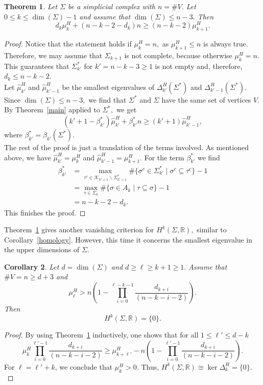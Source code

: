 \documentclass[10pt]{amsart}
\newtheorem{theorem}{Theorem}[section]
\newtheorem{corollary}[theorem]{Corollary}
\theoremstyle{definition}
\newcommand{\K}{\mathcal{K}}
\begin{document}
\begin{theorem}\label{alexestimate}
    Let $\Sigma$ be a simplicial complex with $n = \#V.$ Let $0\leq k\leq\dim(\Sigma)-1$ and assume that $\dim(\Sigma)\leq n-3.$ Then
    \[d_k\mu^H_k+(n-k-2-d_k)n\geq(n-k-2)\mu^H_{k+1}.\]
\end{theorem}
\begin{proof}
    Notice that the statement holds if $\mu_k^H = n,$ as $\mu^H_{k+1}\leq n$ is always true. Therefore, we may assume that $\Sigma_{k+1}$ is not complete, because otherwise $\mu^H_k = n.$ This guarantees that $\Sigma^*_{k'}$ for  $k' = n-k-3\geq 1$ is not empty and, therefore, $d_k\leq n-k-2$.\\
    Let   $\widehat\mu^H_{k'}$ and $\widehat\mu^H_{k'-1}$ be the smallest eigenvalues of $\Delta^H_{k'}(\Sigma^*)$ and $\Delta^H_{k'-1}(\Sigma^*).$
    Since $\dim(\Sigma)\leq n-3,$ we find that $\Sigma^*$ and $\Sigma$ have the same set of vertices $V.$
    By Theorem~\ref{main} applied to $\Sigma^*,$ we get     \[(k'+1-\beta^*_{k'})\widehat\mu^H_{k'}+\beta^*_{k'}n\geq(k'+1)\widehat\mu^H_{k'-1},\]
    where $\beta^*_{k'} = \beta_{k'}(\Sigma^*).$ \\
 The rest of the proof is just a translation of the terms involved. As mentioned above, we have $\widehat\mu^H_{k'} = \mu^H_k$ and  $\widehat\mu^H_{k'-1} = \mu^H_{k+1}.$ For the term $\beta^*_{k'}$ we find
 \begin{align*}
     \beta^*_{k'} &= \max_{\tau^c\in \K_{k'+1}\backslash\Sigma^*_{k'+1}}\#\lbrace\sigma^c\in\Sigma^*_{k'}\mid\sigma^c\subseteq\tau^c\rbrace-1\\
     & = \max_{\tau\in\Sigma_k}\#\lbrace \sigma\in A_k\mid\tau\subseteq\sigma\rbrace-1\\
     & = n-k-2-d_k. \end{align*}
      This finishes the proof. \end{proof}
Theorem~\ref{alexestimate} gives another vanishing criterion for $H^k(\Sigma,\mathbb{R}),$ similar to Corollary~\ref{homology}. However, this time it concerns the smallest eigenvalue in the upper dimensions of $\Sigma.$
\begin{corollary}
    Let $d = \dim(\Sigma)$ and $d\geq\ell\geq k+1\geq 1.$ Assume that $\#V = n\geq d+3$ and 
    \[\mu^H_\ell> n\left(1-\prod_{i= 0}^{\ell-k-1}\frac{d_{k+i}}{(n-k-i-2)}\right).\]
    Then \[H^k(\Sigma,\mathbb{R}) = \lbrace 0\rbrace.\]
\end{corollary}
\begin{proof}
    By using Theorem~\ref{alexestimate} inductively, one shows that for all $1\leq \ell'\leq d-k$
    \[\mu^H_k\prod_{i = 0}^{\ell'-1}\frac{d_{k+i}}{(n-k-i-2)}\geq \mu^H_{k+\ell'}-n\left(1-\prod_{i = 0}^{\ell'-1}\frac{d_{k+i}}{(n-k-i-2)}\right).\] 
    For $\ell = \ell'+k$, we conclude that $\mu^H_k >0.$ Thus, $H^k(\Sigma,\mathbb{R})\cong\ker\Delta^H_k = \lbrace0\rbrace.$
\end{proof}
\end{document}
